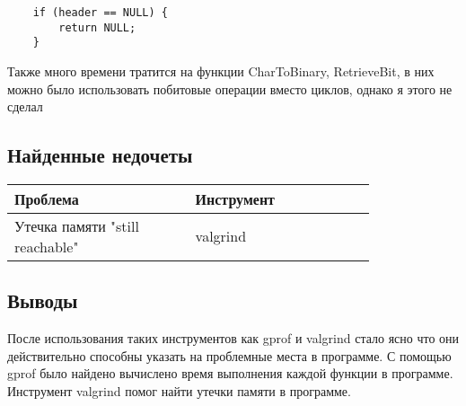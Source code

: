 \documentclass[12pt]{article}
\begin{document}
\begin{lstlisting}
    if (header == NULL) {
        return NULL;
    }
\end{lstlisting}

Также много времени тратится на функции CharToBinary, RetrieveBit, в них можно было использовать побитовые операции вместо циклов, однако я этого не сделал

\subsection*{Найденные недочеты}
\begin{table}[ht]
\centering
\begin{tabular}{p{0.4\linewidth} | p{0.4\linewidth}}
\hline
Проблема & Инструмент \\ \hline
Утечка памяти "still reachable" & valgrind \\ \hline
\end{tabular}
\end{table}

\subsection*{Выводы}
После использования таких инструментов как gprof и valgrind стало ясно что они действительно способны указать на проблемные места в программе. С помощью gprof было найдено вычислено время выполнения каждой функции в программе. Инструмент valgrind помог найти утечки памяти в программе.
\end{document}
